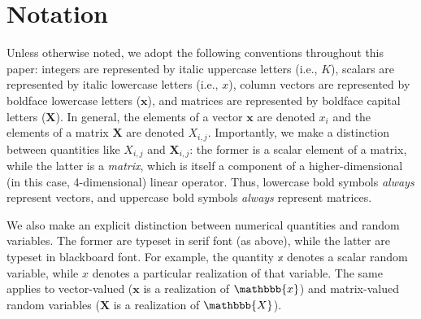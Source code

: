 \documentclass[modern]{aastex62}
\begin{document}
\section{Notation}
\label{sec:notation}
%
Unless otherwise noted, we adopt
the following conventions throughout this paper:
integers are represented by italic uppercase letters (i.e., $K$),
scalars are represented by italic lowercase
letters (i.e., $x$), column vectors are
represented by boldface lowercase letters
($\mathbf{x}$), and matrices are represented
by boldface capital letters ($\mathbf{X}$). In general, the elements of a vector
$\mathbf{x}$ are denoted $x_i$ and the elements of a matrix $\mathbf{X}$
are denoted $X_{i,j}$. Importantly, we make a distinction between
quantities like $X_{i,j}$ and $\mathbf{X}_{i,j}$: the former is a scalar
element of a matrix, while the latter is a \emph{matrix}, which is itself
a component of a higher-dimensional (in this case, 4-dimensional) linear
operator. Thus, lowercase bold symbols \emph{always} represent vectors, and
uppercase bold symbols \emph{always} represent matrices.

We also make an explicit distinction
between numerical quantities and random variables. The former are typeset
in serif font (as above), while the latter are typeset in blackboard font.
For example, the quantity $\mathbb{x}$ denotes a scalar random variable,
while $x$ denotes a particular realization of that variable. The same
applies to vector-valued ($\mathbf{x}$ is a realization of $\mathbbb{x}$)
and matrix-valued random variables
($\mathbf{X}$ is a realization of $\mathbbb{X}$).
\end{document}
